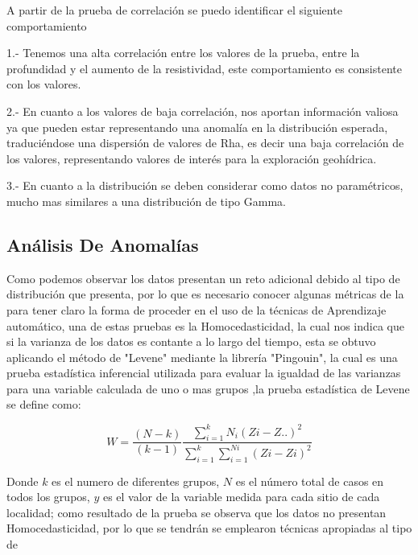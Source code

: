 \documentclass[sn-mathphys,Numbered]{sn-jnl}%
\theoremstyle{thmstyleone}%
\theoremstyle{thmstyletwo}%
\theoremstyle{thmstylethree}%
\begin{document}
A partir de la prueba de correlación se puedo identificar el siguiente comportamiento

1.- Tenemos una alta correlación entre los valores de la prueba, entre la profundidad y el aumento de la resistividad, este comportamiento es consistente con los valores.

2.- En cuanto a los valores de baja correlación, nos aportan información valiosa ya que pueden estar representando una anomalía en la distribución esperada, traduciéndose una dispersión de valores de Rha, es decir una baja correlación de los valores, representando valores de interés para la exploración geohídrica.

3.- En cuanto a la distribución se deben considerar como datos no paramétricos, mucho mas similares a una distribución de tipo Gamma.


\subsection{Análisis De Anomalías}\label{subsec6}
Como podemos observar los datos presentan un reto adicional debido al tipo de distribución que presenta, por lo que es necesario conocer algunas métricas de la para tener claro la forma de proceder en el uso de la técnicas de Aprendizaje automático, una de estas pruebas es la Homocedasticidad, la cual nos indica que si la varianza de los datos es contante a lo largo del tiempo, esta se obtuvo aplicando el método de "Levene" mediante la librería "Pingouin", la cual es una prueba estadística inferencial utilizada para evaluar la igualdad de las varianzas para una variable calculada de uno o mas grupos \cite[Levene, H., 1960]{levene1960},la prueba estadística de Levene se define como:

  \begin{equation}
  	W=\dfrac{(N-k)}{(k-1)}\dfrac{\sum_{i=1}^{k}N_{i}(Z{i}-Z{..})^{2}}{\sum_{i=1}^{k}\sum_{i=1}^{N{i}}(Z{i}-Z{i})^{2}}
  \end{equation}

 Donde $k$ es el numero de diferentes grupos, $N$ es el número total de casos en todos los grupos, $y$ es el valor de la variable medida para cada sitio de cada localidad; como resultado de la prueba se observa que los datos no presentan Homocedasticidad, por lo que se tendrán se emplearon técnicas apropiadas al tipo de 
 
\end{document}
